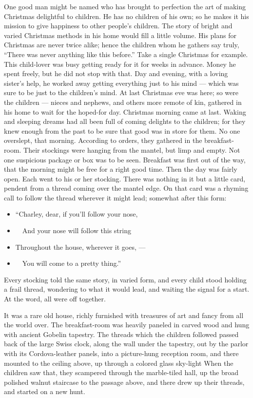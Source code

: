 \documentclass[
]{book}
\providecommand{\tightlist}{%
  \setlength{\itemsep}{0pt}\setlength{\parskip}{0pt}}
\begin{document}
One good man might be named who has brought to perfection the art of making Christmas delightful to children. He has no children of his own; so he makes it his mission to give happiness to other people's children. The story of bright and varied Christmas methods in his home would fill a little volume. His plans for Christmas are never twice alike; hence the children whom he gathers say truly, ``There was never anything like this before.'' Take a single Christmas for example. This child-lover was busy getting ready for it for weeks in advance. Money he spent freely, but he did not stop with that. Day and evening, with a loving sister's help, he worked away getting everything just to his mind --- which was sure to be just to the children's mind. At last Christmas eve was here; so were the children --- nieces and nephews, and others more remote of kin, gathered in his home to wait for the hoped-for day. Christmas morning came at last. Waking and sleeping dreams had all been full of coming delights to the children; for they knew enough from the past to be sure that good was in store for them. No one overslept, that morning. According to orders, they gathered in the breakfast-room. Their stockings were hanging from the mantel, but limp and empty. Not one suspicious package or box was to be seen. Breakfast was first out of the way, that the morning might be free for a right good time. Then the day was fairly open. Each went to his or her stocking. There was nothing in it but a little card, pendent from a thread coming over the mantel edge. On that card was a rhyming call to follow the thread wherever it might lead; somewhat after this form:

\begin{itemize}
\tightlist
\item
  ``Charley, dear, if you'll follow your nose,
\item
  ~~And your nose will follow this string
\item
  Throughout the house, wherever it goes, ---
\item
  ~~You will come to a pretty thing.''
\end{itemize}

Every stocking told the same story, in varied form, and every child stood holding a frail thread, wondering to what it would lead, and waiting the signal for a start. At the word, all were off together.

It was a rare old house, richly furnished with treasures of art and fancy from all the world over. The breakfast-room was heavily paneled in carved wood and hung with ancient Gobelin tapestry. The threads which the children followed passed back of the large Swiss clock, along the wall under the tapestry, out by the parlor with its Cordova-leather panels, into a picture-hung reception room, and there mounted to the ceiling above, up through a colored glass sky-light When the children saw that, they scampered through the marble-tiled hall, up the broad polished walnut staircase to the passage above, and there drew up their threads, and started on a new hunt.
\end{document}
